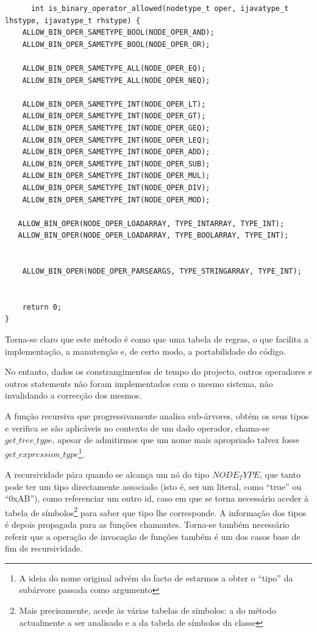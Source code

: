 \documentclass[11pt,a4paper]{article}
\begin{document}
	\begin{lstlisting}
	  int is_binary_operator_allowed(nodetype_t oper, ijavatype_t lhstype, ijavatype_t rhstype) {
    ALLOW_BIN_OPER_SAMETYPE_BOOL(NODE_OPER_AND);
    ALLOW_BIN_OPER_SAMETYPE_BOOL(NODE_OPER_OR);

    ALLOW_BIN_OPER_SAMETYPE_ALL(NODE_OPER_EQ);	
    ALLOW_BIN_OPER_SAMETYPE_ALL(NODE_OPER_NEQ);
    
    ALLOW_BIN_OPER_SAMETYPE_INT(NODE_OPER_LT);
    ALLOW_BIN_OPER_SAMETYPE_INT(NODE_OPER_GT);
    ALLOW_BIN_OPER_SAMETYPE_INT(NODE_OPER_GEQ);
    ALLOW_BIN_OPER_SAMETYPE_INT(NODE_OPER_LEQ);
    ALLOW_BIN_OPER_SAMETYPE_INT(NODE_OPER_ADD);
    ALLOW_BIN_OPER_SAMETYPE_INT(NODE_OPER_SUB);
    ALLOW_BIN_OPER_SAMETYPE_INT(NODE_OPER_MUL);
    ALLOW_BIN_OPER_SAMETYPE_INT(NODE_OPER_DIV);
    ALLOW_BIN_OPER_SAMETYPE_INT(NODE_OPER_MOD);
   	 
   ALLOW_BIN_OPER(NODE_OPER_LOADARRAY, TYPE_INTARRAY, TYPE_INT);
   ALLOW_BIN_OPER(NODE_OPER_LOADARRAY, TYPE_BOOLARRAY, TYPE_INT);


    ALLOW_BIN_OPER(NODE_OPER_PARSEARGS, TYPE_STRINGARRAY, TYPE_INT);
             

	return 0;
}
	\end{lstlisting}
	
	Torna-se claro que este método é como que uma tabela de regras, o que facilita a implementação, a manutenção e, de certo modo, a portabilidade do código.
	
	No entanto, dados os constrangimentos de tempo do projecto, outros operadores e outros statements não foram implementados com o mesmo sistema, não invalidando a correcção dos mesmos.
	
	A função recursiva que progressivamente analisa sub-árvores, obtém os seus tipos e verifica se são aplicáveis no contexto de um dado operador, chama-se $get\_tree\_type$, apesar de admitirmos que um nome mais apropriado talvez fosse $get\_expression\_type$\footnote{A ideia do nome original advém do facto de estarmos a obter o ``tipo'' da subárvore passada como argumento}.
	
	A recursividade pára quando se alcança um nó do tipo $NODE_TYPE$, que tanto pode ter um tipo directamente associado (isto é, ser um literal, como ``true'' ou ``0xAB''), como referenciar um outro id, caso em que se torna necessário aceder à tabela de símbolos\footnote{Mais precisamente, acede às várias tabelas de símbolos: a do método actualmente a ser analisado e a da tabela de símbolos da classe} para saber que tipo lhe corresponde. A informação dos tipos é depois propagada para as funções chamantes. Torna-se também necessário referir que a operação de invocação de funções também é um dos casos base de fim de recursividade. 
	
\end{document}
